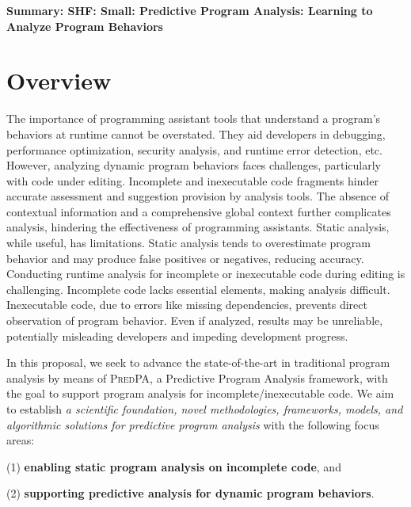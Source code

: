 \documentclass[11pt]{article}
\newcommand{\tool}{\textsc{PredPA}\xspace}
\begin{document}



\begin{center}
  {\bf Summary: SHF: Small: Predictive Program Analysis: Learning to Analyze Program Behaviors}
\end{center}
\vspace{-.1in}



\section{Overview}

The importance of programming assistant tools that understand a
program's behaviors at runtime cannot be overstated. They aid
developers in debugging, performance optimization, security analysis,
and runtime error detection, etc.
However, analyzing dynamic program behaviors faces challenges,
particularly with code under editing. Incomplete and inexecutable code
fragments hinder accurate assessment and suggestion provision by
analysis tools. The absence of contextual information and a
comprehensive global context further complicates analysis, hindering
the effectiveness of programming assistants. Static analysis, while
useful, has limitations. Static analysis tends to overestimate program
behavior and may produce false positives or negatives, reducing
accuracy. Conducting runtime analysis for incomplete or inexecutable
code during editing is challenging. Incomplete code lacks essential
elements, making analysis difficult. Inexecutable code, due to errors
like missing dependencies, prevents direct observation of program
behavior. Even if analyzed, results may be unreliable, potentially
misleading developers and impeding development progress.


In this proposal, we seek to advance the state-of-the-art in
traditional program analysis by means of {\tool}, a Predictive Program
Analysis framework, with the goal to support program analysis for
incomplete/inexecutable code. We aim to establish {\em a scientific
  foundation, novel methodologies, frameworks, models, and algorithmic
  solutions for predictive program analysis} with the following focus
areas:


(1) {\bf enabling static program analysis on incomplete code}, and

(2) {\bf supporting predictive analysis for dynamic program behaviors}.
\end{document}
